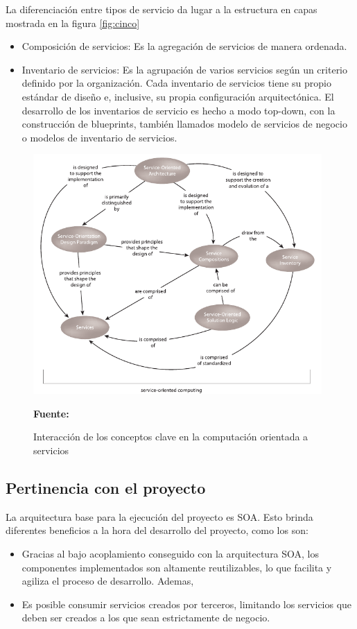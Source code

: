 La diferenciación entre tipos de servicio da lugar a la estructura en capas mostrada en la figura \ref{fig:cinco}

\begin{itemize}
  \item Composición de servicios: Es la agregación de servicios de manera ordenada.
  \item Inventario de servicios: Es la agrupación de varios servicios según un criterio definido por la organización. Cada inventario de servicios tiene su propio estándar de diseño e, inclusive, su propia configuración arquitectónica. El desarrollo de los inventarios de servicio es hecho a modo top-down, con la construcción de blueprints, también llamados modelo de servicios de negocio o modelos de inventario de servicios.
\end{itemize}

\begin{figure}[!htb]
  \begin{center}
    \includegraphics[width=11cm]{./imagenes/4.png}
    \caption{Interacción de los conceptos clave en la computación orientada a servicios}
    \label{fig:cuatro}
    \textbf{Fuente:}  \cite{soa_principles}
  \end{center}
\end{figure}

\subsection{Pertinencia con el proyecto}


La arquitectura base para la ejecución del proyecto es SOA. Esto brinda diferentes beneficios a la hora del desarrollo del proyecto, como los son:
\begin{itemize}
  \item Gracias al bajo acoplamiento conseguido con la arquitectura SOA, los componentes implementados son altamente reutilizables, lo que facilita y agiliza el proceso de desarrollo. Ademas,
  \item Es posible consumir servicios creados por terceros, limitando los servicios que deben ser creados a los que sean estrictamente de negocio.
\end{itemize}

